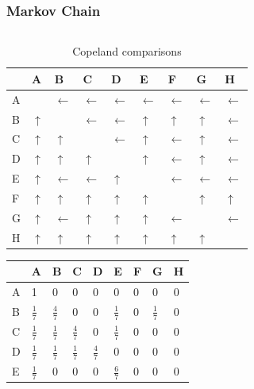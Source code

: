 \begin{frame}[t]
\frametitle{Markov Chain}
\begin{columns}
\begin{column}{0.6\textwidth}
\footnotesize
\vspace{-0.55cm}
\begin{table}
	\begin{tabular}{|l|llllllll|}\hline
		& A & B & C & D & E & F & G & H \\ \hline
		A &   & $\leftarrow$ & $\leftarrow$ & $\leftarrow$ & $\leftarrow$ & $\leftarrow$ & $\leftarrow$ & $\leftarrow$ \\
		B & $\uparrow$ &   & $\leftarrow$ & $\leftarrow$ & $\uparrow$ & $\uparrow$ & $\uparrow$ & $\leftarrow$ \\
		C & $\uparrow$ & $\uparrow$ &   & $\leftarrow$ & $\uparrow$ & $\leftarrow$ & $\uparrow$ & $\leftarrow$ \\
		D & $\uparrow$ & $\uparrow$ & $\uparrow$ &   & $\uparrow$ & $\leftarrow$ & $\uparrow$ & $\leftarrow$ \\
		E & $\uparrow$ & $\leftarrow$ & $\leftarrow$ & $\uparrow$ &   & $\leftarrow$ & $\leftarrow$ & $\leftarrow$ \\
		F & $\uparrow$ & $\uparrow$ & $\uparrow$ & $\uparrow$ & $\uparrow$ &   & $\uparrow$ & $\uparrow$ \\
		G & $\uparrow$ & $\leftarrow$ & $\uparrow$ & $\uparrow$ & $\uparrow$ & $\leftarrow$ &   & $\leftarrow$ \\
		H & $\uparrow$ & $\uparrow$ & $\uparrow$ & $\uparrow$ & $\uparrow$ & $\uparrow$ & $\uparrow$ &  \\ \hline
	\end{tabular}
	\caption{Copeland comparisons}
\end{table}
\vspace{-0.9cm}
\small
\begin{table}
	\begin{tabular}{|l|llllllll|}\hline
		& A & B & C & D & E & F & G & H \\ \hline
		A & 1 & 0 & 0 & 0 & 0 & 0 & 0 & 0 \\ \hline
		B & $\frac{1}{7}$ & $\frac{4}{7}$ & 0 & 0 & $\frac{1}{7}$ & 0 & $\frac{1}{7}$ & 0 \\\hline
		C & $\frac{1}{7}$ & $\frac{1}{7}$ & $\frac{4}{7}$ & 0 & $\frac{1}{7}$ & 0 & 0 & 0 \\\hline
		D & $\frac{1}{7}$ & $\frac{1}{7}$ & $\frac{1}{7}$ & $\frac{4}{7}$ & 0 & 0 & 0 & 0 \\\hline
		E & $\frac{1}{7}$ & 0 & 0 & 0 & $\frac{6}{7}$ & 0 & 0 & 0 \\\hline

\end{tabular}
\end{table}
\end{column}
\end{columns}
\end{frame}
